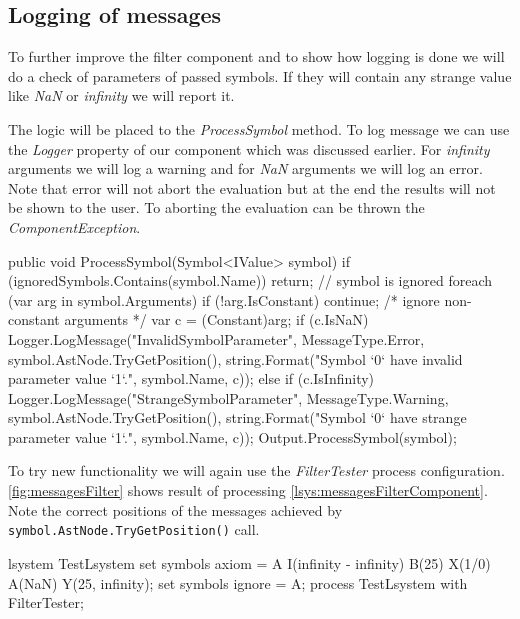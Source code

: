 \subsection{Logging of messages}

To further improve the filter component and to show how logging is done we will do a check of parameters of passed symbols.
If they will contain any strange value like \emph{NaN} or \emph{infinity} we will report it.

The logic will be placed to the \emph{ProcessSymbol} method.
To log message we can use the \emph{Logger} property of our component which was discussed earlier.
For \emph{infinity} arguments we will log a warning and for \emph{NaN} arguments we will log an error.
Note that error will not abort the evaluation but at the end the results will not be shown to the user.
To aborting the evaluation can be thrown the \emph{ComponentException}.

\begin{Csharp}
public void ProcessSymbol(Symbol<IValue> symbol) {
	if (ignoredSymbols.Contains(symbol.Name)) {
		return;  // symbol is ignored
	}
	foreach (var arg in symbol.Arguments) {
		if (!arg.IsConstant) { continue; /* ignore non-constant arguments */ }
		var c = (Constant)arg;
		if (c.IsNaN) {
			Logger.LogMessage("InvalidSymbolParameter", MessageType.Error,
				symbol.AstNode.TryGetPosition(),
				string.Format("Symbol `{0}` have invalid parameter value `{1}`.",
					symbol.Name, c));
		}
		else if (c.IsInfinity) {
			Logger.LogMessage("StrangeSymbolParameter", MessageType.Warning,
				symbol.AstNode.TryGetPosition(),
				string.Format("Symbol `{0}` have strange parameter value `{1}`.",	
					symbol.Name, c));
		}
	}
	Output.ProcessSymbol(symbol);
}
\end{Csharp}

To try new functionality we will again use the \emph{FilterTester} process configuration.
\autoref{fig:messagesFilter} shows result of processing \autoref{lsys:messagesFilterComponent}.
Note the correct positions of the messages achieved by \texttt{symbol.AstNode.TryGetPosition()} call.

\begin{Lsystem}[label=lsys:messagesFilterComponent,caption={\lsystem code for testing improved filter component}]
lsystem TestLsystem {
	set symbols axiom = A I(infinity - infinity) B(25)
		X(1/0) A(NaN) Y(25, infinity);
	set symbols ignore = A;
}
process TestLsystem with FilterTester;
\end{Lsystem}

